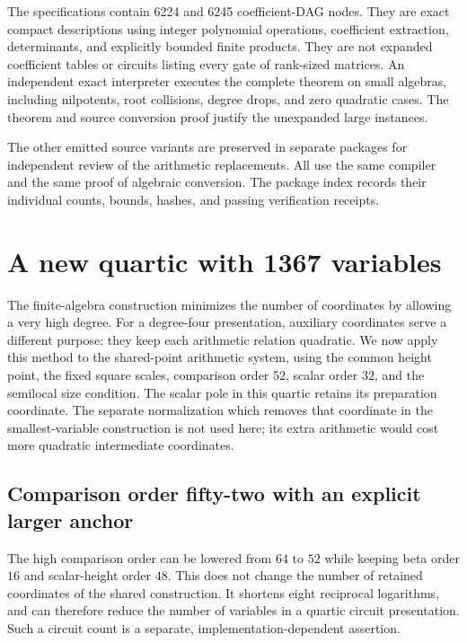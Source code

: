 \documentclass[11pt]{article}
\theoremstyle{definition}
\begin{document}
The specifications contain 6224 and 6245 coefficient-DAG nodes.
They are exact compact descriptions using integer polynomial
operations, coefficient extraction, determinants, and explicitly
bounded finite products.  They are not expanded coefficient
tables or circuits listing every gate of rank-sized matrices.
An independent exact interpreter executes the complete theorem
on small algebras, including nilpotents, root collisions, degree
drops, and zero quadratic cases.  The theorem and source conversion
proof justify the unexpanded large instances.

The other emitted source variants are preserved in separate
packages for independent review of the arithmetic replacements.
All use the same compiler and the same proof of algebraic
conversion.  The package index records their individual counts,
bounds, hashes, and passing verification receipts.


\section{A new quartic with 1367 variables}
\label{sec:new-quartic}

The finite-algebra construction minimizes the number of coordinates by
allowing a very high degree.  For a degree-four presentation, auxiliary
coordinates serve a different purpose: they keep each arithmetic relation
quadratic.  We now apply this method to the shared-point arithmetic system,
using the common height point, the fixed square scales, comparison order
$52$, scalar order $32$, and the semilocal size condition.  The scalar pole
in this quartic retains its preparation coordinate.  The separate
normalization which removes that coordinate in the smallest-variable
construction is not used here; its extra arithmetic would cost more
quadratic intermediate coordinates.

\subsection{Comparison order fifty-two with an explicit larger anchor}
\label{subsec:shared-precision52}

The high comparison order can be lowered from $64$ to $52$ while
keeping beta order $16$ and scalar-height order $48$.  This does not
change the number of retained coordinates of the shared construction.
It shortens eight reciprocal logarithms, and can therefore reduce the
number of variables in a quartic circuit presentation.  Such a circuit
count is a separate, implementation-dependent assertion.
\end{document}
